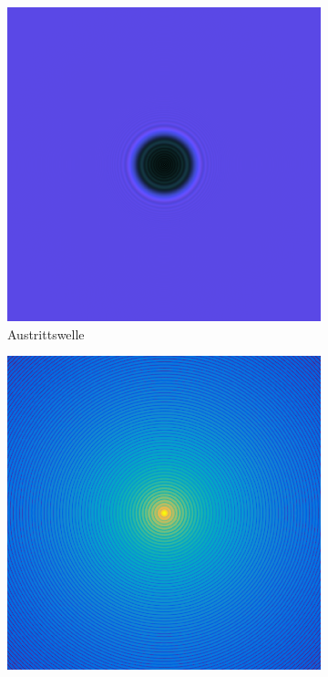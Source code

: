 \begin{figure}
	\centering
	\begin{subfigure}[b]{0.45\textwidth}
		\includegraphics[width=\textwidth]{images/fig_sim_exitwave_multislice-r100-bd1e-3.png}
		\caption{Austrittswelle}
		\label{fig:exitwave}
	\end{subfigure}
	\begin{subfigure}[b]{0.45\textwidth}
		\includegraphics[width=\textwidth]{images/fig_sim_scatter_multislice-r100-bd1e-3.png}

\end{subfigure}
\end{figure}
